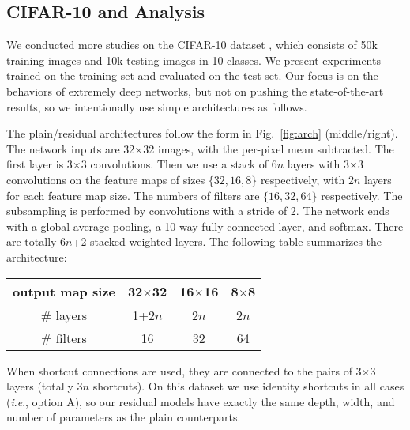 \documentclass{article}
\newcommand{\ie}{\textit{i}.\textit{e}.}
\renewcommand\arraystretch{1.2}
\begin{document}
\subsection{CIFAR-10 and Analysis}

We conducted more studies on the CIFAR-10 dataset \cite{Krizhevsky2009}, which consists of 50k training images and 10k testing images in 10 classes. We present experiments trained on the training set and evaluated on the test set.
Our focus is on the behaviors of extremely deep networks, but not on pushing the state-of-the-art results, so we intentionally use simple architectures as follows.

The plain/residual architectures follow the form in Fig.~\ref{fig:arch} (middle/right).
The network inputs are 32$\times$32 images, with the per-pixel mean subtracted. The first layer is 3$\times$3 convolutions. Then we use a stack of $6n$ layers with 3$\times$3 convolutions on the feature maps of sizes $\{32, 16, 8\}$ respectively, with 2$n$ layers for each feature map size. The numbers of filters are $\{16, 32, 64\}$ respectively. The subsampling is performed by convolutions with a stride of 2. The network ends with a global average pooling, a 10-way fully-connected layer, and softmax. There are totally 6$n$+2 stacked weighted layers. The following table summarizes the architecture:
\renewcommand\arraystretch{1.1}
\begin{center}
\small
\setlength{\tabcolsep}{8pt}
\begin{tabular}{c|c|c|c}
\hline
output map size & 32$\times$32 & 16$\times$16 & 8$\times$8 \\
\hline
\# layers & 1+2$n$ & 2$n$ & 2$n$\\
\# filters & 16 & 32 & 64\\
\hline
\end{tabular}
\end{center}
When shortcut connections are used, they are connected to the pairs of 3$\times$3 layers (totally $3n$ shortcuts). On this dataset we use identity shortcuts in all cases (\ie, option A), so our residual models have exactly the same depth, width, and number of parameters as the plain counterparts.
\end{document}
